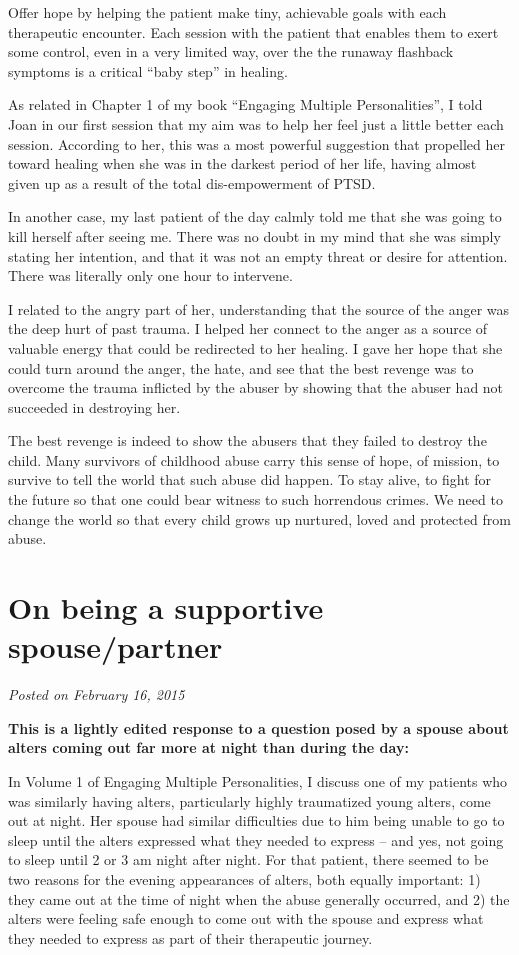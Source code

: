 \documentclass[]{book}
\begin{document}
Offer hope by helping the patient make tiny, achievable goals with each therapeutic encounter. Each session with the patient that enables them to exert some control, even in a very limited way, over the the runaway flashback symptoms is a critical ``baby step'' in healing.

As related in Chapter 1 of my book ``Engaging Multiple Personalities'', I told Joan in our first session that my aim was to help her feel just a little better each session. According to her, this was a most powerful suggestion that propelled her toward healing when she was in the darkest period of her life, having almost given up as a result of the total dis-empowerment of PTSD.

In another case, my last patient of the day calmly told me that she was going to kill herself after seeing me. There was no doubt in my mind that she was simply stating her intention, and that it was not an empty threat or desire for attention. There was literally only one hour to intervene.

I related to the angry part of her, understanding that the source of the anger was the deep hurt of past trauma. I helped her connect to the anger as a source of valuable energy that could be redirected to her healing. I gave her hope that she could turn around the anger, the hate, and see that the best revenge was to overcome the trauma inflicted by the abuser by showing that the abuser had not succeeded in destroying her.

The best revenge is indeed to show the abusers that they failed to destroy the child. Many survivors of childhood abuse carry this sense of hope, of mission, to survive to tell the world that such abuse did happen. To stay alive, to fight for the future so that one could bear witness to such horrendous crimes. We need to change the world so that every child grows up nurtured, loved and protected from abuse.

\hypertarget{on-being-a-supportive-spousepartner}{%
\section{On being a supportive spouse/partner}\label{on-being-a-supportive-spousepartner}}

\emph{Posted on February 16, 2015}

\textbf{This is a lightly edited response to a question posed by a spouse about alters coming out far more at night than during the day:}

In Volume 1 of Engaging Multiple Personalities, I discuss one of my patients who was similarly having alters, particularly highly traumatized young alters, come out at night. Her spouse had similar difficulties due to him being unable to go to sleep until the alters expressed what they needed to express -- and yes, not going to sleep until 2 or 3 am night after night. For that patient, there seemed to be two reasons for the evening appearances of alters, both equally important: 1) they came out at the time of night when the abuse generally occurred, and 2) the alters were feeling safe enough to come out with the spouse and express what they needed to express as part of their therapeutic journey.
\end{document}
